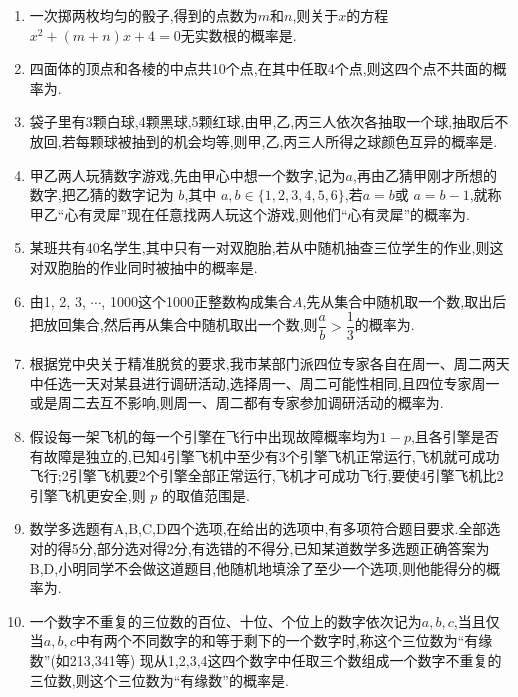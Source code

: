\begin{enumerate}
    \item 一次掷两枚均匀的骰子,得到的点数为$m$和$n$,则关于$x$的方程 $x^{2}+(m+n)x+4=0$无实数根的概率是.

\item 四面体的顶点和各棱的中点共10个点,在其中任取4个点,则这四个点不共面的概率为.

\item 袋子里有3颗白球,4颗黑球,5颗红球,由甲,乙,丙三人依次各抽取一个球,抽取后不放回,若每颗球被抽到的机会均等,则甲,乙,丙三人所得之球颜色互异的概率是.

\item 甲乙两人玩猜数字游戏,先由甲心中想一个数字,记为$a$,再由乙猜甲刚才所想的数字,把乙猜的数字记为 $b$,其中 $a,b\in\{1,2,3,4,5,6\}$,若$a=b$或 $a=b-1$,就称甲乙“心有灵犀”现在任意找两人玩这个游戏,则他们“心有灵犀”的概率为.

\item 某班共有40名学生,其中只有一对双胞胎,若从中随机抽查三位学生的作业,则这对双胞胎的作业同时被抽中的概率是.

\item 由1, 2, 3, $\cdots$, 1000这个1000正整数构成集合$A$,先从集合中随机取一个数,取出后把放回集合,然后再从集合中随机取出一个数,则$\dfrac{a}{b}>\dfrac{1}{3}$的概率为.

\item 根据党中央关于精准脱贫的要求,我市某部门派四位专家各自在周一、周二两天中任选一天对某县进行调研活动,选择周一、周二可能性相同,且四位专家周一或是周二去互不影响,则周一、周二都有专家参加调研活动的概率为.

\item 假设每一架飞机的每一个引擎在飞行中出现故障概率均为$1-p$,且各引擎是否有故障是独立的,已知4引擎飞机中至少有3个引擎飞机正常运行,飞机就可成功飞行;2引擎飞机要2个引擎全部正常运行,飞机才可成功飞行,要使4引擎飞机比2引擎飞机更安全,则 $p$ 的取值范围是.

\item 数学多选题有A,B,C,D四个选项,在给出的选项中,有多项符合题目要求.全部选对的得5分,部分选对得2分,有选错的不得分,已知某道数学多选题正确答案为B,D,小明同学不会做这道题目,他随机地填涂了至少一个选项,则他能得分的概率为.

\item 一个数字不重复的三位数的百位、十位、个位上的数字依次记为$a,b,c$,当且仅当$a,b,c$中有两个不同数字的和等于剩下的一个数字时,称这个三位数为“有缘数”(如213,341等) 现从1,2,3,4这四个数字中任取三个数组成一个数字不重复的三位数,则这个三位数为“有缘数”的概率是.


\end{enumerate}
